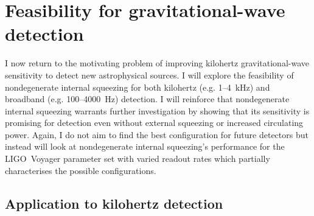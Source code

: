 \section{Feasibility for gravitational-wave detection}

I now return to the motivating problem of improving kilohertz gravitational-wave sensitivity to detect new astrophysical sources. I will explore the feasibility of nondegenerate internal squeezing for both kilohertz (e.g. 1--4~kHz) and broadband (e.g. 100--4000~Hz) detection. I will reinforce that nondegenerate internal squeezing warrants further investigation by showing that its sensitivity is promising for detection even without external squeezing or increased circulating power. Again, I do not aim to find the best configuration for future detectors but instead will look at nondegenerate internal squeezing's performance for the LIGO~Voyager parameter set with varied readout rates which partially characterises the possible configurations.


\subsection{Application to kilohertz detection}

